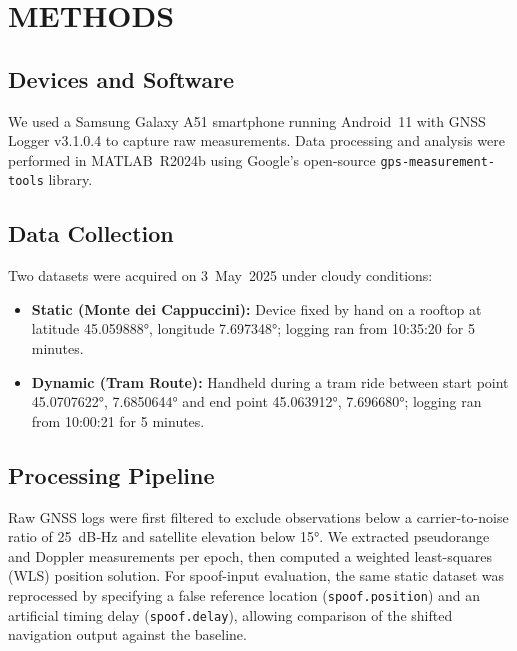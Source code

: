
\section{METHODS} \label{sec:methods}


    \subsection{Devices and Software}
    We used a Samsung Galaxy A51 smartphone running Android 11 with GNSS Logger v3.1.0.4 to capture raw measurements. Data processing and analysis were performed in MATLAB R2024b using Google’s open-source \texttt{gps-measurement-tools} library.
    
    \vspace{-0.2cm}

    \subsection{Data Collection}
    Two datasets were acquired on 3 May 2025 under cloudy conditions:
    \begin{itemize}
      \item \textbf{Static (Monte dei Cappuccini):} Device fixed by hand on a rooftop at latitude 45.059888°, longitude 7.697348°; logging ran from 10:35:20 for 5 minutes.
      \item \textbf{Dynamic (Tram Route):} Handheld during a tram ride between start point 45.0707622°, 7.6850644° and end point 45.063912°, 7.696680°; logging ran from 10:00:21 for 5 minutes.
    \end{itemize}

    \vspace{-0.2cm}

    \subsection{Processing Pipeline}
    Raw GNSS logs were first filtered to exclude observations below a carrier-to-noise ratio of 25 dB‑Hz and satellite elevation below 15°. We extracted pseudorange and Doppler measurements per epoch, then computed a weighted least-squares (WLS) position solution. For spoof-input evaluation, the same static dataset was reprocessed by specifying a false reference location (\texttt{spoof.position}) and an artificial timing delay (\texttt{spoof.delay}), allowing comparison of the shifted navigation output against the baseline.
